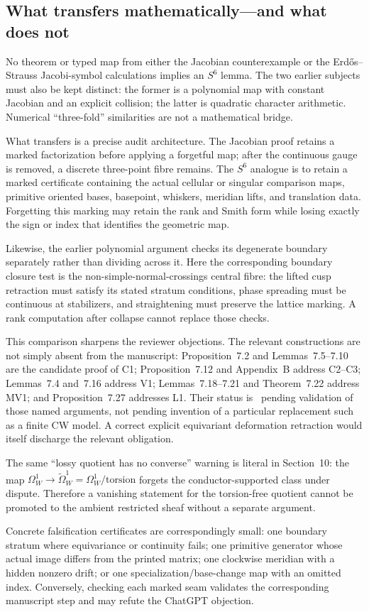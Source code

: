 \subsection{What transfers mathematically---and what does not}

No theorem or typed map from either the Jacobian counterexample or the
Erd\H{o}s--Strauss Jacobi-symbol calculations implies an $S^6$ lemma.  The two
earlier subjects must also be kept distinct: the former is a polynomial map
with constant Jacobian and an explicit collision; the latter is quadratic
character arithmetic.  Numerical ``three-fold'' similarities are not a
mathematical bridge.

What transfers is a precise audit architecture.  The Jacobian proof retains a
marked factorization before applying a forgetful map; after the continuous
gauge is removed, a discrete three-point fibre remains.  The $S^6$ analogue is
to retain a marked certificate containing the actual cellular or singular
comparison maps, primitive oriented bases, basepoint, whiskers, meridian
lifts, and translation data.  Forgetting this marking may retain the rank and
Smith form while losing exactly the sign or index that identifies the
geometric map.

Likewise, the earlier polynomial argument checks its degenerate boundary
separately rather than dividing across it.  Here the corresponding boundary
closure test is the non-simple-normal-crossings central fibre: the lifted cusp
retraction must satisfy its stated stratum conditions, phase spreading must be
continuous at stabilizers, and straightening must preserve the lattice
marking.  A rank computation after collapse cannot replace those checks.

This comparison sharpens the reviewer objections.  The relevant constructions
are not simply absent from the manuscript: Proposition~7.2 and
Lemmas~7.5--7.10 are the candidate proof of C1; Proposition~7.12 and
Appendix~B address C2--C3; Lemmas~7.4 and~7.16 address V1;
Lemmas~7.18--7.21 and Theorem~7.22 address MV1; and Proposition~7.27
addresses L1.  Their status is \Open\ pending validation of those named
arguments, not pending invention of a particular replacement such as a finite
CW model.  A correct explicit equivariant deformation retraction would itself
discharge the relevant obligation.

The same ``lossy quotient has no converse'' warning is literal in Section~10:
the map $\Omega_W^1\to\widetilde\Omega_W^1=\Omega_W^1/\mathrm{torsion}$
forgets the conductor-supported class under dispute.  Therefore a vanishing
statement for the torsion-free quotient cannot be promoted to the ambient
restricted sheaf without a separate argument.

Concrete falsification certificates are correspondingly small: one boundary
stratum where equivariance or continuity fails; one primitive generator whose
actual image differs from the printed matrix; one clockwise meridian with a
hidden nonzero drift; or one specialization/base-change map with an omitted
index.  Conversely, checking each marked seam validates the corresponding
manuscript step and may refute the ChatGPT objection.
